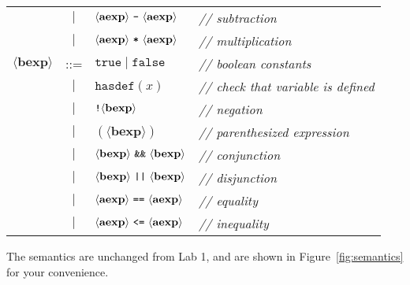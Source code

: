 \documentclass[11pt]{article}
\begin{document}
{\begin{center}
\begin{tabular}{lcll}
& $\mid$ & $\langle\mathbf{aexp}\rangle~\text{\texttt{-}}~\langle\mathbf{aexp}\rangle$ & \textit{// subtraction}
\\
& $\mid$ & $\langle\mathbf{aexp}\rangle~\text{\texttt{*}}~\langle\mathbf{aexp}\rangle$ & \textit{// multiplication}
\\
$\langle\mathbf{bexp}\rangle$ & ::= & $\mathtt{true} \mid \mathtt{false}$ &  \textit{// boolean constants}
\\
& $\mid$ & $\mathtt{hasdef}(x)$ & \textit{// check that variable is defined}
\\
& $\mid$ & $\text{\texttt{!}}\langle\mathbf{bexp}\rangle$ & \textit{// negation}
\\
& $\mid$ & $(\langle\mathbf{bexp}\rangle)$ & \textit{// parenthesized expression}
\\
& $\mid$ & $\langle\mathbf{bexp}\rangle~\text{\texttt{\&\&}}~\langle\mathbf{bexp}\rangle$ & \textit{// conjunction}
\\
& $\mid$ & $\langle\mathbf{bexp}\rangle~\text{\texttt{||}}~\langle\mathbf{bexp}\rangle$ & \textit{// disjunction}
\\
& $\mid$ & $\langle\mathbf{aexp}\rangle~\text{\texttt{==}}~\langle\mathbf{aexp}\rangle$ & \textit{// equality}
\\
& $\mid$ & $\langle\mathbf{aexp}\rangle~\text{\texttt{<=}}~\langle\mathbf{aexp}\rangle$ & \textit{// inequality}
\end{tabular}
\end{center}

The semantics are unchanged from Lab 1, and are shown in Figure~\ref{fig:semantics} for your convenience. 

}
\end{document}
